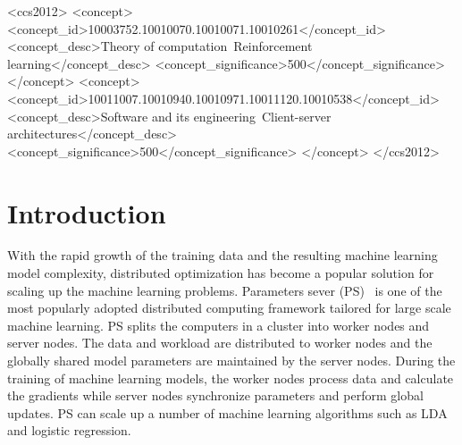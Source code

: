 \documentclass[sigconf]{acmart}
\begin{document}
\begin{CCSXML}
	<ccs2012>
	<concept>
	<concept_id>10003752.10010070.10010071.10010261</concept_id>
	<concept_desc>Theory of computation~Reinforcement learning</concept_desc>
	<concept_significance>500</concept_significance>
	</concept>
	<concept>
	<concept_id>10011007.10010940.10010971.10011120.10010538</concept_id>
	<concept_desc>Software and its engineering~Client-server architectures</concept_desc>
	<concept_significance>500</concept_significance>
	</concept>
	</ccs2012>
\end{CCSXML}




\maketitle

\section{Introduction}\label{sec:Intro}

With the rapid growth of the training data and the resulting machine learning model complexity, distributed optimization has become a popular solution for scaling up the machine learning problems. Parameters sever (PS)~\cite{li2014scaling} is one of the most popularly adopted distributed computing framework tailored for large scale machine learning. PS splits the computers in a cluster into worker nodes and server nodes. The data and workload are distributed to worker nodes and the globally shared model parameters are maintained by the server nodes. During the training of machine learning models, the worker nodes process data and calculate the gradients while server nodes synchronize parameters and perform global updates. PS can scale up a number of machine learning algorithms such as LDA and logistic regression.
\end{document}
